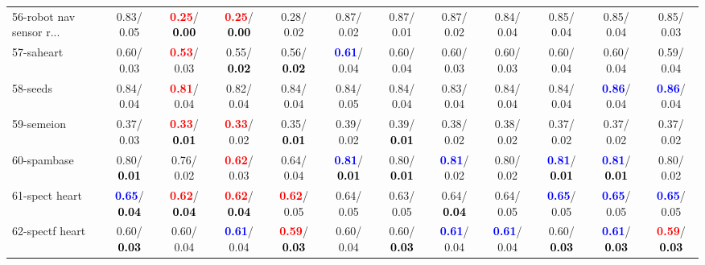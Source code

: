 \begin{table}[h]
\begin{center}
{\begin{tabular}{lc|c|c|c|c|c|c|c|c|c|c}
56-robot nav sensor r... &   0.83/  0.05 & \textcolor{red}{\textbf{  0.25}}/\textcolor{black}{\textbf{  0.00}} & \textcolor{red}{\textbf{  0.25}}/\textcolor{black}{\textbf{  0.00}} &   0.28/  0.02 &   0.87/  0.02 &   0.87/  0.01 &   0.87/  0.02 &   0.84/  0.04 &   0.85/  0.04 &   0.85/  0.04 &   0.85/  0.03 \\
57-saheart &   0.60/  0.03 & \textcolor{red}{\textbf{  0.53}}/  0.03 &   0.55/\textcolor{black}{\textbf{  0.02}} &   0.56/\textcolor{black}{\textbf{  0.02}} & \textcolor{blue}{\textbf{  0.61}}/  0.04 &   0.60/  0.04 &   0.60/  0.03 &   0.60/  0.03 &   0.60/  0.04 &   0.60/  0.04 &   0.59/  0.04 \\
58-seeds &   0.84/  0.04 & \textcolor{red}{\textbf{  0.81}}/  0.04 &   0.82/  0.04 &   0.84/  0.04 &   0.84/  0.05 &   0.84/  0.04 &   0.83/  0.04 &   0.84/  0.04 &   0.84/  0.04 & \textcolor{blue}{\textbf{  0.86}}/  0.04 & \textcolor{blue}{\textbf{  0.86}}/  0.04 \\
59-semeion &   0.37/  0.03 & \textcolor{red}{\textbf{  0.33}}/\textcolor{black}{\textbf{  0.01}} & \textcolor{red}{\textbf{  0.33}}/  0.02 &   0.35/\textcolor{black}{\textbf{  0.01}} &   0.39/  0.02 &   0.39/\textcolor{black}{\textbf{  0.01}} &   0.38/  0.02 &   0.38/  0.02 &   0.37/  0.02 &   0.37/  0.02 &   0.37/  0.02 \\
60-spambase &   0.80/\textcolor{black}{\textbf{  0.01}} &   0.76/  0.02 & \textcolor{red}{\textbf{  0.62}}/  0.03 &   0.64/  0.04 & \textcolor{blue}{\textbf{  0.81}}/\textcolor{black}{\textbf{  0.01}} &   0.80/\textcolor{black}{\textbf{  0.01}} & \textcolor{blue}{\textbf{  0.81}}/  0.02 &   0.80/  0.02 & \textcolor{blue}{\textbf{  0.81}}/\textcolor{black}{\textbf{  0.01}} & \textcolor{blue}{\textbf{  0.81}}/\textcolor{black}{\textbf{  0.01}} &   0.80/  0.02 \\ \hline
61-spect heart & \textcolor{blue}{\textbf{  0.65}}/\textcolor{black}{\textbf{  0.04}} & \textcolor{red}{\textbf{  0.62}}/\textcolor{black}{\textbf{  0.04}} & \textcolor{red}{\textbf{  0.62}}/\textcolor{black}{\textbf{  0.04}} & \textcolor{red}{\textbf{  0.62}}/  0.05 &   0.64/  0.05 &   0.63/  0.05 &   0.64/\textcolor{black}{\textbf{  0.04}} &   0.64/  0.05 & \textcolor{blue}{\textbf{  0.65}}/  0.05 & \textcolor{blue}{\textbf{  0.65}}/  0.05 & \textcolor{blue}{\textbf{  0.65}}/  0.05 \\
62-spectf heart &   0.60/\textcolor{black}{\textbf{  0.03}} &   0.60/  0.04 & \textcolor{blue}{\textbf{  0.61}}/  0.04 & \textcolor{red}{\textbf{  0.59}}/\textcolor{black}{\textbf{  0.03}} &   0.60/  0.04 &   0.60/\textcolor{black}{\textbf{  0.03}} & \textcolor{blue}{\textbf{  0.61}}/  0.04 & \textcolor{blue}{\textbf{  0.61}}/  0.04 &   0.60/\textcolor{black}{\textbf{  0.03}} & \textcolor{blue}{\textbf{  0.61}}/\textcolor{black}{\textbf{  0.03}} & \textcolor{red}{\textbf{  0.59}}/\textcolor{black}{\textbf{  0.03}} \\

\end{tabular}}
\end{center}
\end{table}
